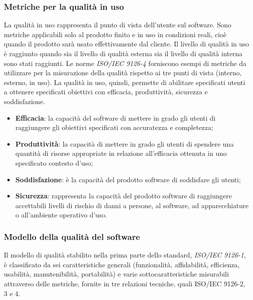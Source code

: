\subsubsection{Metriche per la qualità in uso}
La qualità in uso rappresenta il punto di vista dell'utente sul software. Sono metriche applicabili solo al prodotto finito e in uso in condizioni reali, cioè quando il prodotto sarà usato effettivamente dal cliente.
Il livello di qualità in uso è raggiunto quando sia il livello di qualità esterna sia il livello di qualità interna sono stati raggiunti. Le norme \textit{ISO/IEC 9126-4} forniscono esempi di metriche da utilizzare per la misurazione della qualità rispetto ai tre punti di vista (interno, esterno, in uso). La qualità in uso, quindi, permette di abilitare specificati utenti a ottenere specificati obiettivi con efficacia, produttività, sicurezza e soddisfazione.

\begin{itemize}
\item \textbf{Efficacia}: la capacità del software di mettere in grado gli utenti di raggiungere gli obiettivi specificati con accuratezza e completezza;
\item \textbf{Produttività}: la capacità di mettere in grado gli utenti di spendere una quantità di risorse appropriate in relazione all'efficacia ottenuta in uno specificato contesto d'uso;
\item \textbf{Soddisfazione}: è la capacità del prodotto software di soddisfare gli utenti;
\item \textbf{Sicurezza}: rappresenta la capacità del prodotto software di raggiungere accettabili livelli di rischio di danni a persone, al software, ad apparecchiature o all'ambiente operativo d'uso.
\end{itemize}

\subsubsection{Modello della qualità del software}
Il modello di qualità stabilito nella prima parte dello standard, \textit{ISO/IEC 9126-1}, è classificato da sei caratteristiche generali (funzionalità, affidabilità, efficienza, usabilità, manutenibilità, portabilità) e varie sottocaratteristiche misurabili attraverso delle metriche, fornite in tre relazioni tecniche, quali ISO/IEC 9126-2, 3 e 4. 

